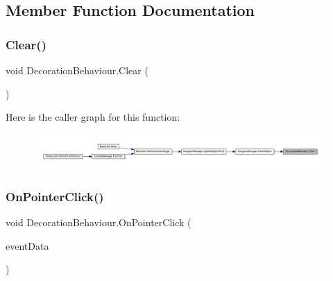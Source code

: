 \subsection{Member Function Documentation}
\mbox{\label{class_decoration_behaviour_aab39ad5614d361801ffc9168a830c3d7}} 
\subsubsection{\texorpdfstring{Clear()}{Clear()}}
{\footnotesize\ttfamily void Decoration\+Behaviour.\+Clear (\begin{DoxyParamCaption}{ }\end{DoxyParamCaption})}

Here is the caller graph for this function\+:
\nopagebreak
\begin{figure}[H]
\begin{center}
\leavevmode
\includegraphics[width=350pt]{class_decoration_behaviour_aab39ad5614d361801ffc9168a830c3d7_icgraph}
\end{center}
\end{figure}
\mbox{\label{class_decoration_behaviour_a94a1b5e492f096e3f121d05105e16c37}} 
\subsubsection{\texorpdfstring{OnPointerClick()}{OnPointerClick()}}
{\footnotesize\ttfamily void Decoration\+Behaviour.\+On\+Pointer\+Click (\begin{DoxyParamCaption}\item[{Pointer\+Event\+Data}]{event\+Data }\end{DoxyParamCaption})}


